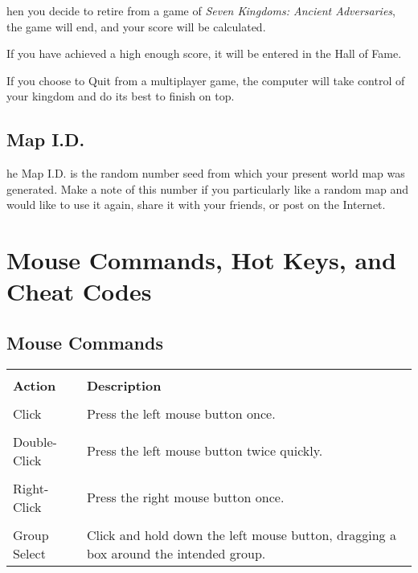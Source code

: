 
hen you decide to retire from a game of \textit{Seven Kingdoms: Ancient Adversaries}, the game will end, and your score will be calculated.

If you have achieved a high enough score, it will be entered in the Hall of Fame.

If you choose to Quit from a multiplayer game, the computer will take control of your kingdom and do its best to finish on top.

\subsection{\textsf{Map I.D.}}



he Map I.D. is the random number seed from which your present world map was generated. Make a note of this number if you particularly like a random map and would like to use it again, share it with your friends, or post on the Internet.

\section{\textsf{Mouse Commands, Hot Keys, and Cheat Codes}}


\subsection{\textsf{Mouse Commands}}



\begin{tabular}{|p{1in} p{3in}|}
    \hline \\
    \textbf{Action} & \textbf{Description} \\ \\
    \hline
    Click & Press the left mouse button once. \\ \\
    Double-Click & Press the left mouse button twice quickly. \\ \\
    Right-Click    & Press the right mouse button once. \\ \\
    Group Select & Click and hold down the left mouse button, dragging a box around the intended group. \\
    \hline
\end{tabular}    
    

